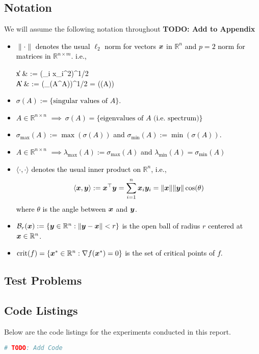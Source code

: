 \documentclass[10pt]{article}
\begin{document}
\subsection*{Notation}
    We will assume the following notation throughout \textbf{TODO: Add to Appendix}\
    \textcolor{Black}{
        \begin{itemize}
            \item $\| \cdot \|$ denotes the usual $\ell_2$ norm for vectors $\bm{x}$ in $\mathbb{R}^n$ and $p = 2$ norm
            for matrices in $\mathbb{R}^{n \times m}$. i.e.,
            \begin{flalign*}
                \|x\| & := \left(\sum_i x_i^2\right)^{1/2} \\
                 \|A\| & := (\lambda_{\max}(A^\top A))^{1/2}
            = \max(\sigma(A))
            \end{flalign*}
            \item $\sigma(A) := \{\text{singular values of } A\}$.
            \item $A \in \mathbb{R}^{n\times n}$ $\implies ~ \sigma(A) = \{\text{eigenvalues of } A \text{ (i.e. spectrum)}\}$
            \item $\sigma_{\max}(A) := \max(\sigma(A))$ and $\sigma_{\min}(A) := \min(\sigma(A))$.
            \item $ A \in \mathbb{R}^{n\times n}$  $\implies \lambda_{\max}(A) := \sigma_{\max}(A)$ and $\lambda_{\min}(A) = \sigma_{\min}(A) $
            \item $\langle \cdot, \cdot \rangle$ denotes the usual inner product on $\mathbb{R}^n$, i.e.,
            $$
                \langle \bm{x}, \bm{y} \rangle := \bm{x}^\top \bm{y} = \sum_{i=1}^n \bm{x}_i \bm{y}_i = \| \bm{x} \| \|\bm{y}\| \cos(\theta)
            $$
            where $\theta$ is the angle between $\bm{x}$ and $\bm{y}$.
            \item $\mathcal{B}_r(\bm{x}) := \{ \bm{y} \in \mathbb{R}^n : \|\bm{y} - \bm{x}\| < r \}$ is the open ball of radius $r$ centered at $\bm{x} \in \mathbb{R}^n$.
            \item $\text{crit}(f) = \{ \bm{x}^* \in \mathbb{R}^n : \nabla f(\bm{x}^*) = 0 \}$ is the set of critical points of $f$.
        \end{itemize}
    }






\newpage
\subsection{Test Problems}
\newpage




\subsection{Code Listings}
Below are the code listings for the experiments conducted in this report.
\lstset{language=julia}
\begin{lstlisting}[language=julia, caption={Algorithm 16.5}]
    # TODO: Add Code
\end{lstlisting}
\newpage







\end{document}

